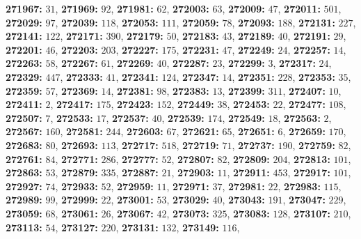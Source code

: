 \textsf{\bfseries 271967:} $31$, \textsf{\bfseries 271969:} $92$, \textsf{\bfseries 271981:} $62$, \textsf{\bfseries 272003:} $63$, \textsf{\bfseries 272009:} $47$, \textsf{\bfseries 272011:} $501$, \textsf{\bfseries 272029:} $97$, \textsf{\bfseries 272039:} $118$, \textsf{\bfseries 272053:} $111$, \textsf{\bfseries 272059:} $78$, \textsf{\bfseries 272093:} $188$, \textsf{\bfseries 272131:} $227$, \textsf{\bfseries 272141:} $122$, \textsf{\bfseries 272171:} $390$, \textsf{\bfseries 272179:} $50$, \textsf{\bfseries 272183:} $43$, \textsf{\bfseries 272189:} $40$, \textsf{\bfseries 272191:} $29$, \textsf{\bfseries 272201:} $46$, \textsf{\bfseries 272203:} $203$, \textsf{\bfseries 272227:} $175$, \textsf{\bfseries 272231:} $47$, \textsf{\bfseries 272249:} $24$, \textsf{\bfseries 272257:} $14$, \textsf{\bfseries 272263:} $58$, \textsf{\bfseries 272267:} $61$, \textsf{\bfseries 272269:} $40$, \textsf{\bfseries 272287:} $23$, \textsf{\bfseries 272299:} $3$, \textsf{\bfseries 272317:} $24$, \textsf{\bfseries 272329:} $447$, \textsf{\bfseries 272333:} $41$, \textsf{\bfseries 272341:} $124$, \textsf{\bfseries 272347:} $14$, \textsf{\bfseries 272351:} $228$, \textsf{\bfseries 272353:} $35$, \textsf{\bfseries 272359:} $57$, \textsf{\bfseries 272369:} $14$, \textsf{\bfseries 272381:} $98$, \textsf{\bfseries 272383:} $13$, \textsf{\bfseries 272399:} $311$, \textsf{\bfseries 272407:} $10$, \textsf{\bfseries 272411:} $2$, \textsf{\bfseries 272417:} $175$, \textsf{\bfseries 272423:} $152$, \textsf{\bfseries 272449:} $38$, \textsf{\bfseries 272453:} $22$, \textsf{\bfseries 272477:} $108$, \textsf{\bfseries 272507:} $7$, \textsf{\bfseries 272533:} $17$, \textsf{\bfseries 272537:} $40$, \textsf{\bfseries 272539:} $174$, \textsf{\bfseries 272549:} $18$, \textsf{\bfseries 272563:} $2$, \textsf{\bfseries 272567:} $160$, \textsf{\bfseries 272581:} $244$, \textsf{\bfseries 272603:} $67$, \textsf{\bfseries 272621:} $65$, \textsf{\bfseries 272651:} $6$, \textsf{\bfseries 272659:} $170$, \textsf{\bfseries 272683:} $80$, \textsf{\bfseries 272693:} $113$, \textsf{\bfseries 272717:} $518$, \textsf{\bfseries 272719:} $71$, \textsf{\bfseries 272737:} $190$, \textsf{\bfseries 272759:} $82$, \textsf{\bfseries 272761:} $84$, \textsf{\bfseries 272771:} $286$, \textsf{\bfseries 272777:} $52$, \textsf{\bfseries 272807:} $82$, \textsf{\bfseries 272809:} $204$, \textsf{\bfseries 272813:} $101$, \textsf{\bfseries 272863:} $53$, \textsf{\bfseries 272879:} $335$, \textsf{\bfseries 272887:} $21$, \textsf{\bfseries 272903:} $11$, \textsf{\bfseries 272911:} $453$, \textsf{\bfseries 272917:} $101$, \textsf{\bfseries 272927:} $74$, \textsf{\bfseries 272933:} $52$, \textsf{\bfseries 272959:} $11$, \textsf{\bfseries 272971:} $37$, \textsf{\bfseries 272981:} $22$, \textsf{\bfseries 272983:} $115$, \textsf{\bfseries 272989:} $99$, \textsf{\bfseries 272999:} $22$, \textsf{\bfseries 273001:} $53$, \textsf{\bfseries 273029:} $40$, \textsf{\bfseries 273043:} $191$, \textsf{\bfseries 273047:} $229$, \textsf{\bfseries 273059:} $68$, \textsf{\bfseries 273061:} $26$, \textsf{\bfseries 273067:} $42$, \textsf{\bfseries 273073:} $325$, \textsf{\bfseries 273083:} $128$, \textsf{\bfseries 273107:} $210$, \textsf{\bfseries 273113:} $54$, \textsf{\bfseries 273127:} $220$, \textsf{\bfseries 273131:} $132$, \textsf{\bfseries 273149:} $116$, 

